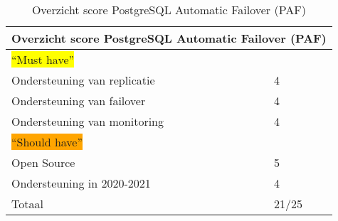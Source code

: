 \begin{table}[!h]
    \centering
    \begin{tabular}{ |p{6cm}||p{6cm}|  }
        \hline
        \multicolumn{2}{|c|}{Overzicht score PostgreSQL Automatic Failover (PAF)} \\
        \hline
        \colorbox{yellow}{“Must have”} & \\
        \hline
        Ondersteuning van replicatie  & 4 \\
        Ondersteuning van failover &  4 \\
        Ondersteuning van monitoring & 4 \\
        \hline
        \colorbox{orange}{“Should have”} & \\
        \hline
        Open Source &  5 \\
        Ondersteuning in 2020-2021 & 4 \\
        \hline
        \hline
        Totaal & 21/25 \\
        \hline    
    \end{tabular}
    \caption{Overzicht score PostgreSQL Automatic Failover (PAF)}
    \label{table:Overzicht score PostgreSQL Automatic Failover (PAF)}
\end{table}
